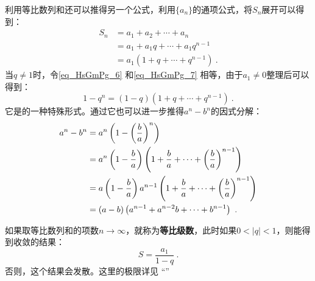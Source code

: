 利用等比数列和还可以推得另一个公式，利用$\{a_n\}$的通项公式，将$S_n$展开可以得到：
\begin{equation}\label{eq_HsGmPg_7}
\begin{aligned}
S_n& = a_1 + a_2 + \cdots + a_n \\
&= a_1+a_1q+ \cdots + a_1q^{n-1}\\
&= a_1(1+q+ \cdots +q^{n-1})~.
\end{aligned}
\end{equation}
当$q\neq1$时，令\autoref{eq_HsGmPg_6} 和\autoref{eq_HsGmPg_7} 相等，由于$a_1\neq0$整理后可以得到：
\begin{equation}
1 - q^n=(1-q)(1+q+ \cdots +q^{n-1})~.
\end{equation}
它是的一种特殊形式。通过它也可以进一步推得$a^n-b^n$的因式分解：
\begin{equation}
\begin{aligned}
a^n-b^n& = a^n\left(1-\left({b\over a}\right)^n\right)\\
&= a^n\left(1-{b\over a}\right)\left(1+{b\over a}+\cdots+\left({b\over a}\right)^{n-1}\right)\\
&= a\left(1-{b\over a}\right)a^{n-1}\left(1+{b\over a}+\cdots+\left({b\over a}\right)^{n-1}\right)\\
&= \left(a-b\right)\left(a^{n-1}+a^{n-2}b+\cdots+b^{n-1}\right)~.
\end{aligned}
\end{equation}

如果取等比数列和的项数$n\rightarrow \infty$，就称为\textbf{等比级数}，此时如果$0<|q|<1$，则能得到收敛的结果：
\begin{equation}
S = \frac{a_1}{1 - q}~.
\end{equation}
否则，这个结果会发散。这里的极限详见 “”